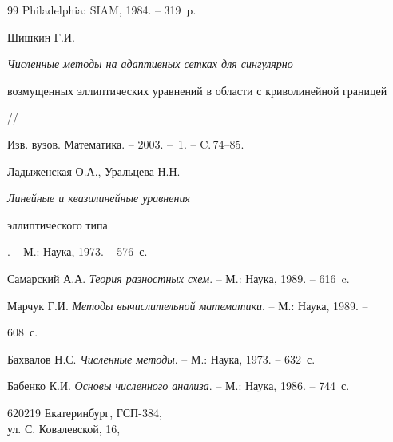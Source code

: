 \begin{thebibliography}{99}
Philadelphia: SIAM, 1984. -- 319~p.




Шишкин Г.И. {\em Численные методы на адаптивных сетках для сингулярно


возмущенных эллиптических уравнений в области с криволинейной границей} //


Изв. вузов. Математика. -- 2003. -- \No\,1. -- C.\,74--85.




Ладыженская О.А., Уральцева Н.Н. {\em Линейные и квазилинейные уравнения 


эллиптического типа}. -- М.: Наука, 1973. -- 576~с.




Самарский А.А. {\em Теория разностных схем}. -- М.: Наука, 1989. -- 616~c.




Марчук Г.И. {\em Методы вычислительной математики}. -- М.: Наука, 1989. --


608~с.




Бахвалов Н.С. {\em Численные методы}. -- М.: Наука, 1973. -- 632~с.




Бабенко К.И. {\em Основы численного анализа}. -- М.: Наука, 1986. -- 744~с.





\end{thebibliography}





\vskip 2cm














\label{end}











620219 Екатеринбург, ГСП-384,\\


ул. С. Ковалевской, 16,\\


